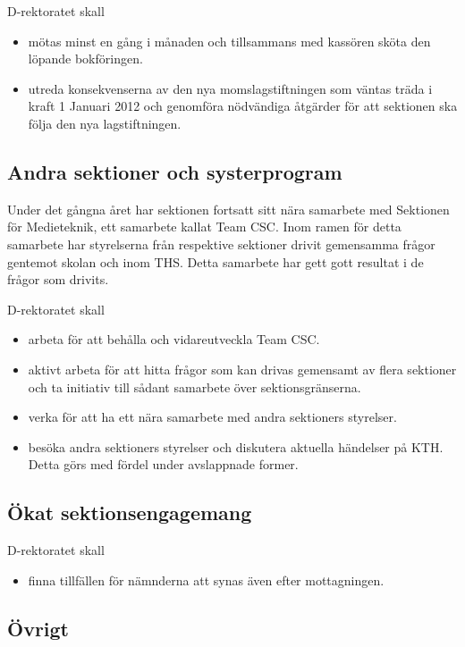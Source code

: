 \documentclass{dgovdoc}
\begin{document}
D-rektoratet skall

\begin{itemize}
\item mötas minst en gång i månaden och tillsammans med kassören sköta den
  löpande bokföringen.
\item utreda konsekvenserna av den nya momslagstiftningen som väntas träda i
  kraft 1 Januari 2012 och genomföra nödvändiga åtgärder för att sektionen
  ska följa den nya lagstiftningen.
\end{itemize}

\subsection{Andra sektioner och systerprogram}

Under det gångna året har sektionen fortsatt sitt nära samarbete med Sektionen
för Medieteknik, ett samarbete kallat Team CSC. Inom ramen för detta samarbete
har styrelserna från respektive sektioner drivit gemensamma frågor gentemot
skolan och inom THS. Detta samarbete har gett gott resultat i de frågor som
drivits.

D-rektoratet skall

\begin{itemize}
\item arbeta för att behålla och vidareutveckla Team CSC.
\item aktivt arbeta för att hitta frågor som kan drivas gemensamt av flera
  sektioner och ta initiativ till sådant samarbete över sektionsgränserna.
\item verka för att ha ett nära samarbete med andra sektioners styrelser.
\item besöka andra sektioners styrelser och diskutera aktuella händelser på
  KTH. Detta görs med fördel under avslappnade former.
\end{itemize}

\subsection{Ökat sektionsengagemang}

D-rektoratet skall

\begin{itemize}
\item finna tillfällen för nämnderna att synas även efter mottagningen.
\end{itemize}

\subsection{Övrigt}
\end{document}
